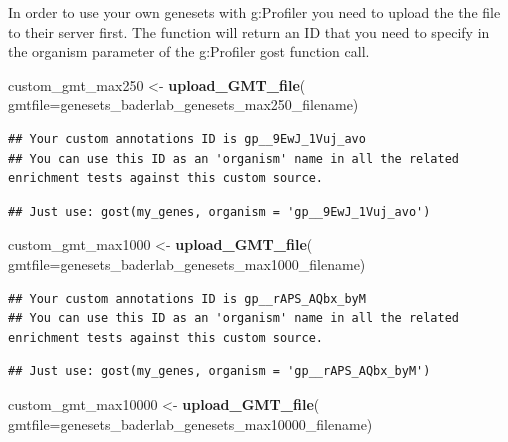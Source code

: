 \documentclass[
]{book}
\newenvironment{Shaded}{\begin{snugshade}}{\end{snugshade}}
\newcommand{\AttributeTok}[1]{\textcolor[rgb]{0.13,0.29,0.53}{#1}}
\newcommand{\FunctionTok}[1]{\textcolor[rgb]{0.13,0.29,0.53}{\textbf{#1}}}
\newcommand{\NormalTok}[1]{#1}
\newcommand{\OtherTok}[1]{\textcolor[rgb]{0.56,0.35,0.01}{#1}}
\begin{document}
In order to use your own genesets with g:Profiler you need to upload the the file to their server first. The function will return an ID that you need to specify in the organism parameter of the g:Profiler gost function call.

\begin{Shaded}
\begin{Highlighting}[]
\NormalTok{custom\_gmt\_max250 }\OtherTok{\textless{}{-}} \FunctionTok{upload\_GMT\_file}\NormalTok{(}
                        \AttributeTok{gmtfile=}\NormalTok{genesets\_baderlab\_genesets\_max250\_filename)}
\end{Highlighting}
\end{Shaded}

\begin{verbatim}
## Your custom annotations ID is gp__9EwJ_1Vuj_avo
## You can use this ID as an 'organism' name in all the related enrichment tests against this custom source.
\end{verbatim}

\begin{verbatim}
## Just use: gost(my_genes, organism = 'gp__9EwJ_1Vuj_avo')
\end{verbatim}

\begin{Shaded}
\begin{Highlighting}[]
\NormalTok{custom\_gmt\_max1000 }\OtherTok{\textless{}{-}} \FunctionTok{upload\_GMT\_file}\NormalTok{(}
                        \AttributeTok{gmtfile=}\NormalTok{genesets\_baderlab\_genesets\_max1000\_filename)}
\end{Highlighting}
\end{Shaded}

\begin{verbatim}
## Your custom annotations ID is gp__rAPS_AQbx_byM
## You can use this ID as an 'organism' name in all the related enrichment tests against this custom source.
\end{verbatim}

\begin{verbatim}
## Just use: gost(my_genes, organism = 'gp__rAPS_AQbx_byM')
\end{verbatim}

\begin{Shaded}
\begin{Highlighting}[]
\NormalTok{custom\_gmt\_max10000 }\OtherTok{\textless{}{-}} \FunctionTok{upload\_GMT\_file}\NormalTok{(}
                        \AttributeTok{gmtfile=}\NormalTok{genesets\_baderlab\_genesets\_max10000\_filename)}
\end{Highlighting}
\end{Shaded}
\end{document}
